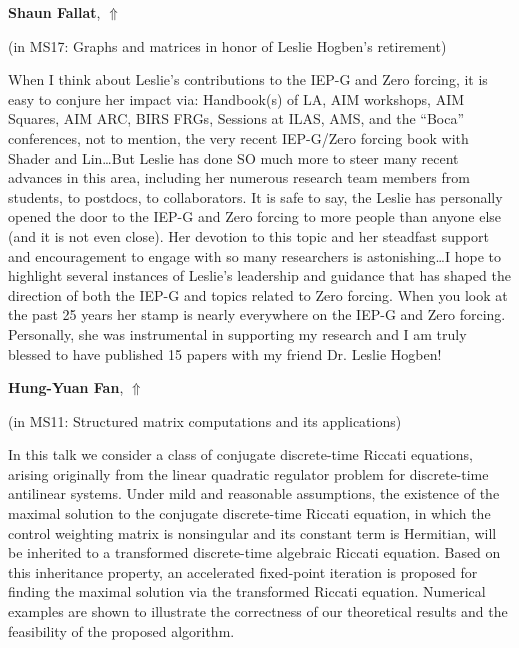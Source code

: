 \documentclass[ILAS2025-program.tex]{subfiles}
\begin{document}
\hypertarget{down0376}{}\begin{ilasabstract}
    
\textbf{Shaun Fallat},  \hfill \hyperlink{up0376}{$\Uparrow$}
    
    
(in {\color{mstitle}MS17: Graphs and matrices in honor of Leslie Hogben's retirement})
        
\mtskip
    When I think about Leslie's contributions to the IEP-G and Zero forcing, it is easy to conjure her impact via: Handbook(s) of LA, AIM workshops, AIM Squares, AIM ARC, BIRS FRGs, Sessions at ILAS, AMS, and the ``Boca'' conferences, not to mention, the very recent IEP-G/Zero forcing book with Shader and Lin…But Leslie has done SO much more to steer many recent advances in this area, including her numerous research team members from students, to postdocs, to collaborators. It is safe to say, the Leslie has personally opened the door to the IEP-G and Zero forcing to more people than anyone else (and it is not even close).  Her devotion to this topic and her steadfast support and encouragement to engage with so many researchers is astonishing…I hope to highlight several instances of Leslie's leadership and guidance that has shaped the direction of both the IEP-G and topics related to Zero forcing. When you look at the past 25 years her stamp is nearly everywhere on the IEP-G and Zero forcing. Personally, she was instrumental in supporting my research and I am truly blessed to have published 15 papers with my friend Dr. Leslie Hogben!
\end{ilasabstract}
    

\hypertarget{down0270}{}\begin{ilasabstract}
    
\textbf{Hung-Yuan Fan},  \hfill \hyperlink{up0270}{$\Uparrow$}
    
    
(in {\color{mstitle}MS11: Structured matrix computations and its applications})
        
\mtskip
    In this talk we consider a class of conjugate discrete-time Riccati equations, arising originally from the linear quadratic regulator problem for discrete-time antilinear systems. Under mild and reasonable assumptions, the existence of the maximal solution to the conjugate discrete-time Riccati equation, in which the control weighting matrix is nonsingular and its constant term is Hermitian, will be inherited to a transformed discrete-time algebraic Riccati equation. Based on this inheritance property, an accelerated fixed-point iteration is proposed for finding the maximal solution via the transformed Riccati equation. Numerical examples are shown to illustrate the correctness of our theoretical results and the feasibility of the proposed algorithm.
\end{ilasabstract}
    
\end{document}

